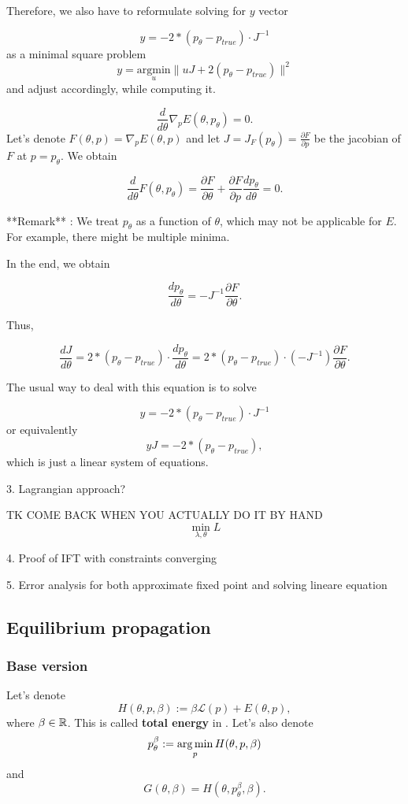 \documentclass[a4paper,10pt]{report}
\begin{document}
Therefore, we also have to reformulate solving for $y$ vector

$$y =- 2*(p_\theta-p_{true}) \cdot J^{-1}$$
as a minimal square problem
$$y = \underset{u}{\mathrm{argmin }}\|uJ + 2(p_\theta-p_{true})\|^2$$ and adjust accordingly, while computing it.


$$ \frac{d}{d\theta} \nabla_p E(\theta,p_\theta) = 0.$$
 Let's denote $F(\theta,p) = \nabla_p E(\theta,p)$ and let $J = J_{F}(p_\theta)=\frac{\partial F}{\partial p}$ be the jacobian of $F$ at $p = p_\theta$.
We obtain

$$\frac{d}{d\theta}F(\theta,p_\theta) = \frac{\partial F}{\partial \theta} + \frac{\partial F}{\partial p}\frac{d p_\theta}{d\theta}= 0 .$$

**Remark** : We treat $p_\theta$ as a function of $\theta$, which may not be applicable for $E$.
For example, there might be multiple minima.

In the end, we obtain

$$ \frac{d p_\theta}{d\theta} = - J^{-1} \frac{\partial F}{\partial \theta}.$$

Thus,

$$\frac{d J}{d\theta} = 2*(p_\theta-p_{true})\cdot \frac{d p_\theta}{d\theta} = 2*(p_\theta-p_{true})\cdot (-J^{-1}) \frac{\partial F}{\partial \theta}.$$

The usual way to deal with this equation is to solve

$$y =- 2*(p_\theta-p_{true}) \cdot J^{-1}$$
or equivalently
$$ yJ = -2*(p_\theta - p_{true}),$$ which is just a linear system of equations.

3. Lagrangian approach?

TK COME BACK WHEN YOU ACTUALLY DO IT BY HAND
 \begin{equation}
\min_{\lambda,\theta} L
 \end{equation}

4. Proof of IFT with constraints converging

5. Error analysis for both approximate fixed point and solving lineare equation
\subsection{ Equilibrium propagation}

\subsubsection{Base version}

Let's denote
\begin{equation}
H(\theta, p, \beta) := \beta \mathcal{L}(p) + E(\theta, p),
\end{equation}
where $\beta \in \mathbb{R}$.
 This is called \textbf{total energy} in \cite{eqprop}. Let's also denote
\begin{equation}
p_{\theta}^{\beta}:=\operatorname*{arg\,min}_p H(\theta, p, \beta)
\end{equation}
and
\begin{equation}
 G(\theta, \beta) = H(\theta, p_\theta^\beta, \beta).
\end{equation}
\end{document}

